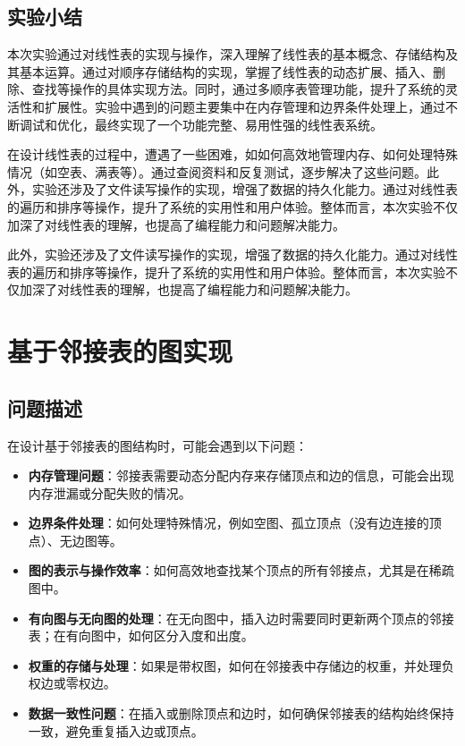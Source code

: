 \documentclass[supercite]{Experimental_Report}
\theoremstyle{definition}
\begin{document}
\subsection{实验小结}

本次实验通过对线性表的实现与操作，深入理解了线性表的基本概念、存储结构及其基本运算。通过对顺序存储结构的实现，掌握了线性表的动态扩展、插入、删除、查找等操作的具体实现方法。同时，通过多顺序表管理功能，提升了系统的灵活性和扩展性。实验中遇到的问题主要集中在内存管理和边界条件处理上，通过不断调试和优化，最终实现了一个功能完整、易用性强的线性表系统。

在设计线性表的过程中，遭遇了一些困难，如如何高效地管理内存、如何处理特殊情况（如空表、满表等）。通过查阅资料和反复测试，逐步解决了这些问题。此外，实验还涉及了文件读写操作的实现，增强了数据的持久化能力。通过对线性表的遍历和排序等操作，提升了系统的实用性和用户体验。整体而言，本次实验不仅加深了对线性表的理解，也提高了编程能力和问题解决能力。

此外，实验还涉及了文件读写操作的实现，增强了数据的持久化能力。通过对线性表的遍历和排序等操作，提升了系统的实用性和用户体验。整体而言，本次实验不仅加深了对线性表的理解，也提高了编程能力和问题解决能力。



\newpage

\section{基于邻接表的图实现}

\subsection{问题描述}

在设计基于邻接表的图结构时，可能会遇到以下问题：
\begin{itemize}
    \item \textbf{内存管理问题}：邻接表需要动态分配内存来存储顶点和边的信息，可能会出现内存泄漏或分配失败的情况。
    \item \textbf{边界条件处理}：如何处理特殊情况，例如空图、孤立顶点（没有边连接的顶点）、无边图等。
    \item \textbf{图的表示与操作效率}：如何高效地查找某个顶点的所有邻接点，尤其是在稀疏图中。
    \item \textbf{有向图与无向图的处理}：在无向图中，插入边时需要同时更新两个顶点的邻接表；在有向图中，如何区分入度和出度。
    \item \textbf{权重的存储与处理}：如果是带权图，如何在邻接表中存储边的权重，并处理负权边或零权边。
    \item \textbf{数据一致性问题}：在插入或删除顶点和边时，如何确保邻接表的结构始终保持一致，避免重复插入边或顶点。
\end{itemize}
\end{document}
